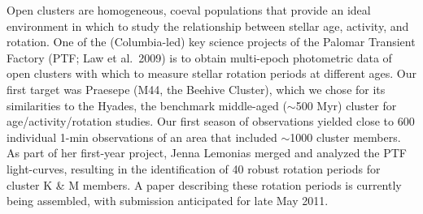 %
%
%
%

\justification
Open clusters are homogeneous, coeval populations that provide an ideal environment in which to study the relationship between stellar age, activity, and rotation. One of the (Columbia-led) key science projects of the Palomar Transient Factory (PTF; Law et al.\ 2009) is to obtain multi-epoch photometric data of open clusters with which to measure stellar rotation periods at different ages. Our first target was Praesepe (M44, the Beehive Cluster), which we chose for its similarities to the Hyades, the benchmark middle-aged ($\sim$500 Myr) cluster for age/activity/rotation studies. Our first season of observations yielded close to 600 individual 1-min observations of an area that included $\sim$1000 cluster members. As part of her first-year project, Jenna Lemonias merged and analyzed the PTF light-curves, resulting in the identification of 40 robust rotation periods for cluster K \& M members. A paper describing these rotation periods is currently being assembled, with submission anticipated for late May 2011. 

